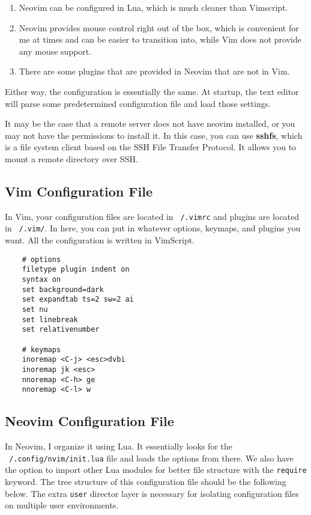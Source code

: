   \begin{enumerate}
    \item Neovim can be configured in Lua, which is much cleaner than Vimscript. 
    \item Neovim provides mouse control right out of the box, which is convenient for me at times and can be easier to transition into, while Vim does not provide any mouse support. 
    \item There are some plugins that are provided in Neovim that are not in Vim. 
  \end{enumerate}

  Either way, the configuration is essentially the same. At startup, the text editor will parse some predetermined configuration file and load those settings. 

  It may be the case that a remote server does not have neovim installed, or you may not have the permissions to install it. In this case, you can use \textbf{sshfs}, which is a file system client based on the SSH File Transfer Protocol. It allows you to mount a remote directory over SSH. 

\subsection{Vim Configuration File}

  In Vim, your configuration files are located in \texttt{~/.vimrc} and plugins are located in \texttt{~/.vim/}. In here, you can put in whatever options, keymaps, and plugins you want. All the configuration is written in VimScript. 

  \begin{lstlisting} 
    # options 
    filetype plugin indent on 
    syntax on 
    set background=dark
    set expandtab ts=2 sw=2 ai
    set nu
    set linebreak 
    set relativenumber        
    
    # keymaps
    inoremap <C-j> <esc>dvbi
    inoremap jk <esc>
    nnoremap <C-h> ge
    nnoremap <C-l> w 
  \end{lstlisting}
    
\subsection{Neovim Configuration File}

  In Neovim, I organize it using Lua. It essentially looks for the \texttt{~/.config/nvim/init.lua} file and loads the options from there. We also have the option to import other Lua modules for better file structure with the \texttt{require} keyword. The tree structure of this configuration file should be the following below. The extra \texttt{user} director layer is necessary for isolating configuration files on multiple user environments.  
  
